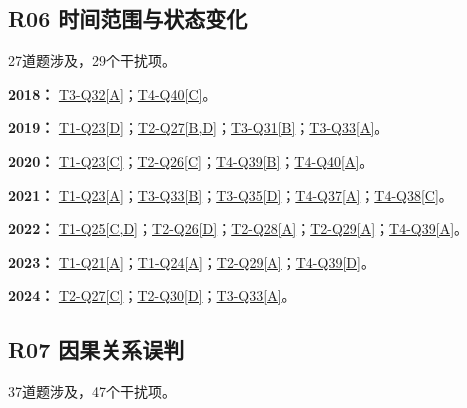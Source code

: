 \documentclass[11pt,a4paper]{article}
\begin{document}
\subsection{R06 时间范围与状态变化}\label{class-R06}
27道题涉及，29个干扰项。

\noindent\textbf{2018：} \hyperref[idx-2018-T3-Q32]{T3-Q32[A]}；\hyperref[idx-2018-T4-Q40]{T4-Q40[C]}。\par\smallskip
\noindent\textbf{2019：} \hyperref[idx-2019-T1-Q23]{T1-Q23[D]}；\hyperref[idx-2019-T2-Q27]{T2-Q27[B,D]}；\hyperref[idx-2019-T3-Q31]{T3-Q31[B]}；\hyperref[idx-2019-T3-Q33]{T3-Q33[A]}。\par\smallskip
\noindent\textbf{2020：} \hyperref[idx-2020-T1-Q23]{T1-Q23[C]}；\hyperref[idx-2020-T2-Q26]{T2-Q26[C]}；\hyperref[idx-2020-T4-Q39]{T4-Q39[B]}；\hyperref[idx-2020-T4-Q40]{T4-Q40[A]}。\par\smallskip
\noindent\textbf{2021：} \hyperref[idx-2021-T1-Q23]{T1-Q23[A]}；\hyperref[idx-2021-T3-Q33]{T3-Q33[B]}；\hyperref[idx-2021-T3-Q35]{T3-Q35[D]}；\hyperref[idx-2021-T4-Q37]{T4-Q37[A]}；\hyperref[idx-2021-T4-Q38]{T4-Q38[C]}。\par\smallskip
\noindent\textbf{2022：} \hyperref[idx-2022-T1-Q25]{T1-Q25[C,D]}；\hyperref[idx-2022-T2-Q26]{T2-Q26[D]}；\hyperref[idx-2022-T2-Q28]{T2-Q28[A]}；\hyperref[idx-2022-T2-Q29]{T2-Q29[A]}；\hyperref[idx-2022-T4-Q39]{T4-Q39[A]}。\par\smallskip
\noindent\textbf{2023：} \hyperref[idx-2023-T1-Q21]{T1-Q21[A]}；\hyperref[idx-2023-T1-Q24]{T1-Q24[A]}；\hyperref[idx-2023-T2-Q29]{T2-Q29[A]}；\hyperref[idx-2023-T4-Q39]{T4-Q39[D]}。\par\smallskip
\noindent\textbf{2024：} \hyperref[idx-2024-T2-Q27]{T2-Q27[C]}；\hyperref[idx-2024-T2-Q30]{T2-Q30[D]}；\hyperref[idx-2024-T3-Q33]{T3-Q33[A]}。\par\smallskip
{}
\subsection{R07 因果关系误判}\label{class-R07}
37道题涉及，47个干扰项。
\end{document}
